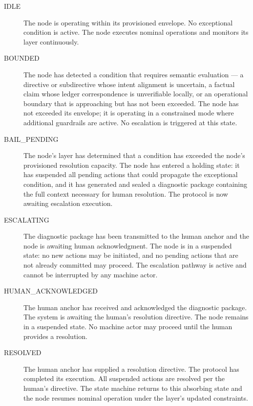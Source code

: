 \begin{description}
\item[IDLE] The node is operating within its provisioned envelope. No exceptional condition is active. The node executes nominal operations and monitors its \bounds{} layer continuously.

\item[BOUNDED] The node has detected a condition that requires semantic evaluation — a directive or subdirective whose intent alignment is uncertain, a factual claim whose ledger correspondence is unverifiable locally, or an operational boundary that is approaching but has not been exceeded. The node has not exceeded its envelope; it is operating in a constrained mode where additional guardrails are active. No escalation is triggered at this state.

\item[BAIL\_PENDING] The node's \bounds{} layer has determined that a condition has exceeded the node's provisioned resolution capacity. The node has entered a holding state: it has suspended all pending actions that could propagate the exceptional condition, and it has generated and sealed a diagnostic package containing the full context necessary for human resolution. The protocol is now awaiting escalation execution.

\item[ESCALATING] The diagnostic package has been transmitted to the human anchor and the node is awaiting human acknowledgment. The node is in a suspended state: no new actions may be initiated, and no pending actions that are not already committed may proceed. The escalation pathway is active and cannot be interrupted by any machine actor.

\item[HUMAN\_ACKNOWLEDGED] The human anchor has received and acknowledged the diagnostic package. The system is awaiting the human's resolution directive. The node remains in a suspended state. No machine actor may proceed until the human provides a resolution.

\item[RESOLVED] The human anchor has supplied a resolution directive. The protocol has completed its execution. All suspended actions are resolved per the human's directive. The state machine returns to this absorbing state and the node resumes nominal operation under the \bounds{} layer's updated constraints.
\end{description}

